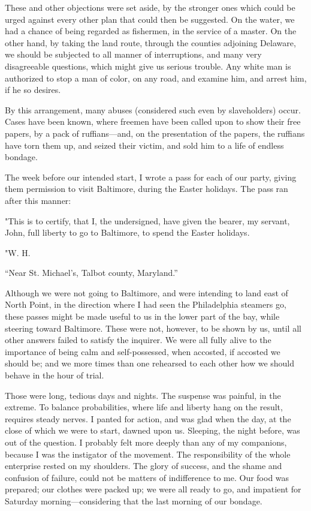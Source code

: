 These and other objections were set aside, by the stronger ones which
could be urged against every other plan that could then be suggested. On
the water, we had a chance of being regarded as fishermen, in the
service of a master. On the other hand, by taking the land route,
through the counties adjoining Delaware, we should be subjected to all
manner of interruptions, and many very disagreeable questions, which
might give us serious trouble. Any white man is authorized to stop a man
of color, on any road, and examine him, and arrest him, if he so
desires.

By this arrangement, many abuses (considered such even by slaveholders)
occur. Cases have been known, where freemen have been called upon to
show their free papers, by a pack of ruffians---and, on the presentation
of the papers, the ruffians have torn them up, and seized their victim,
and sold him to a life of endless bondage.

The week before our intended start, I wrote a pass for each of our
party, giving them permission to visit Baltimore, during the Easter
holidays. The pass ran after this manner: {}

"This is to certify, that I, the undersigned, have given the bearer, my
servant, John, full liberty to go to Baltimore, to spend the Easter
holidays.

"W. H.

{``Near St. Michael's, Talbot county, Maryland.''}

Although we were not going to Baltimore, and were intending to land east
of North Point, in the direction where I had seen the Philadelphia
steamers go, these passes might be made useful to us in the lower part
of the bay, while steering toward Baltimore. These were not, however, to
be shown by us, until all other answers failed to satisfy the inquirer.
We were all fully alive to the importance of being calm and
self-possessed, when accosted, if accosted we should be; and we more
times than one rehearsed to each other how we should behave in the hour
of trial.

Those were long, tedious days and nights. The suspense was painful, in
the extreme. To balance probabilities, where life and liberty hang on
the result, requires steady nerves. I panted for action, and was glad
when the day, at the close of which we were to start, dawned upon us.
Sleeping, the night before, was out of the question. I probably felt
more deeply than any of my companions, because I was the instigator of
the movement. The responsibility of the whole enterprise rested on my
shoulders. The glory of success, and the shame and confusion of failure,
could not be matters of indifference to me. Our food was prepared; our
clothes were packed up; we were all ready to go, and impatient for
Saturday morning---considering that the last morning of our bondage.

